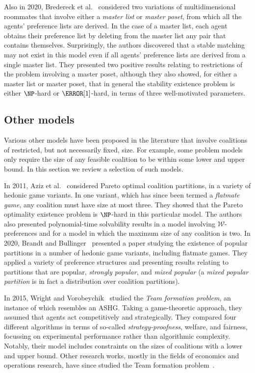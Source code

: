 Also in 2020, Bredereck et al.~\cite{Bre20} considered two variations of multidimensional roommates that involve either a \emph{master list} or \emph{master poset}, from which all the agents' preference lists are derived. In the case of a master list, each agent obtains their preference list by deleting from the master list any pair that contains themselves. Surprisingly, the authors discovered that a stable matching may not exist in this model even if all agents' preference lists are derived from a single master list. They presented two positive results relating to restrictions of the problem involving a master poset, although they also showed, for either a master list or master poset, that in general the stability existence problem is either $\NP$-hard or $\W[1]$-hard, in terms of three well-motivated parameters.

\subsection{Other models}
\label{sec:lit_review_othermodels}

Various other models have been proposed in the literature that involve coalitions of restricted, but not necessarily fixed, size. For example, some problem models only require the size of any feasible coalition to be within some lower and upper bound. In this section we review a selection of such models.

In 2011, Aziz et al.~\cite{ABH11} considered Pareto optimal coalition partitions, in a variety of hedonic game variants. In one variant, which has since been termed a \emph{flatmate game}, any coalition must have size at most three. They showed that the Pareto optimality existence problem is $\NP$-hard in this particular model. The authors also presented polynomial-time solvability results in a model involving $\mathscr{W}$-preferences and for a model in which the maximum size of any coalition is two. In 2020, Brandt and Bullinger~\cite{Brandt2020FindingAR} presented a paper studying the existence of popular partitions in a number of hedonic game variants, including flatmate games. They applied a variety of preference structures and presenting results relating to partitions that are popular, \emph{strongly popular}, and \emph{mixed popular} (a \emph{mixed popular partition} is in fact a distribution over coalition partitions).

In 2015, Wright and Vorobeychik~\cite{WrightV15} studied the \emph{Team formation problem}, an instance of which resembles an ASHG. Taking a game-theoretic approach, they assumed that agents act competitively and strategically. They compared four different algorithms in terms of so-called \emph{strategy-proofness}, welfare, and fairness, focussing on experimental performance rather than algorithmic complexity. Notably, their model includes constraints on the sizes of coalitions with a lower and upper bound.
Other research works, mostly in the fields of economics and operations research, have since studied the Team formation problem~\cite{yekta2018finding}.


